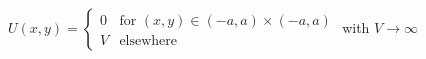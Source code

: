 $
  U(x, y)=
  \begin{cases}
    0 & \text{for } (x, y) \in (-a, a) \times (-a, a) \\
    V & \text{elsewhere }
  \end{cases}
$
\medskip with
$
  V \rightarrow \infty
$
